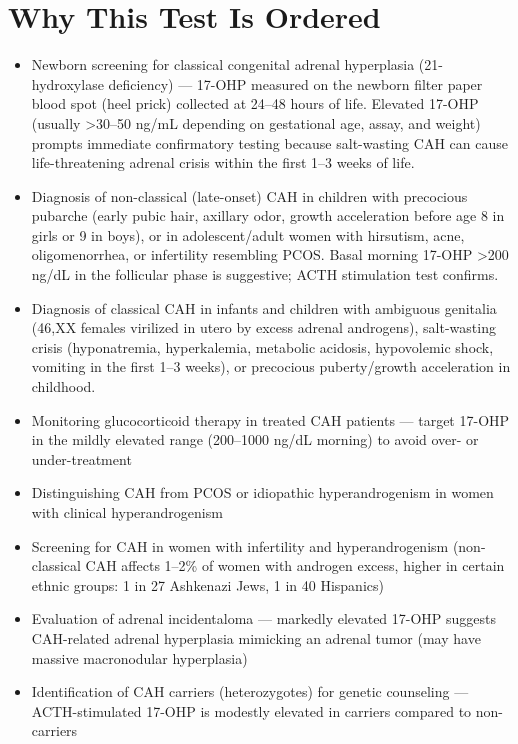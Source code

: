 \section*{Why This Test Is Ordered}
\begin{itemize}
  \item Newborn screening for classical congenital adrenal hyperplasia (21-hydroxylase deficiency) --- 17-OHP measured on the newborn filter paper blood spot (heel prick) collected at 24--48 hours of life. Elevated 17-OHP (usually >30--50 ng/mL depending on gestational age, assay, and weight) prompts immediate confirmatory testing because salt-wasting CAH can cause life-threatening adrenal crisis within the first 1--3 weeks of life.
  \item Diagnosis of non-classical (late-onset) CAH in children with precocious pubarche (early pubic hair, axillary odor, growth acceleration before age 8 in girls or 9 in boys), or in adolescent/adult women with hirsutism, acne, oligomenorrhea, or infertility resembling PCOS. Basal morning 17-OHP >200 ng/dL in the follicular phase is suggestive; ACTH stimulation test confirms.
  \item Diagnosis of classical CAH in infants and children with ambiguous genitalia (46,XX females virilized in utero by excess adrenal androgens), salt-wasting crisis (hyponatremia, hyperkalemia, metabolic acidosis, hypovolemic shock, vomiting in the first 1--3 weeks), or precocious puberty/growth acceleration in childhood.
  \item Monitoring glucocorticoid therapy in treated CAH patients --- target 17-OHP in the mildly elevated range (200--1000 ng/dL morning) to avoid over- or under-treatment
  \item Distinguishing CAH from PCOS or idiopathic hyperandrogenism in women with clinical hyperandrogenism
  \item Screening for CAH in women with infertility and hyperandrogenism (non-classical CAH affects 1--2\% of women with androgen excess, higher in certain ethnic groups: 1 in 27 Ashkenazi Jews, 1 in 40 Hispanics)
  \item Evaluation of adrenal incidentaloma --- markedly elevated 17-OHP suggests CAH-related adrenal hyperplasia mimicking an adrenal tumor (may have massive macronodular hyperplasia)
  \item Identification of CAH carriers (heterozygotes) for genetic counseling --- ACTH-stimulated 17-OHP is modestly elevated in carriers compared to non-carriers
\end{itemize}

